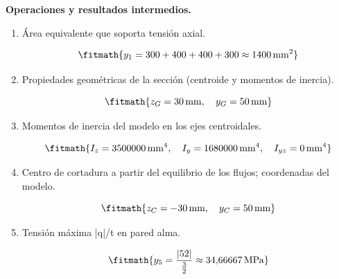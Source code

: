 \noindent\textbf{Operaciones y resultados intermedios.}

\begin{enumerate}

\item Área equivalente que soporta tensión axial.

\[\fitmath{y_{1}=300+400+400+300\approx 1400\,\mathrm{mm^{2}}}\]

\item Propiedades geométricas de la sección (centroide y momentos de inercia).

\[\fitmath{z_G=30\,\mathrm{mm},\quad y_G=50\,\mathrm{mm}}\]

\item Momentos de inercia del modelo en los ejes centroidales.

\[\fitmath{I_z=3500000\,\mathrm{mm}^{4},\quad I_y=1680000\,\mathrm{mm}^{4},\quad I_{yz}=0\,\mathrm{mm}^{4}}\]

\item Centro de cortadura a partir del equilibrio de los flujos; coordenadas del modelo.

\[\fitmath{z_C=-30\,\mathrm{mm},\quad y_C=50\,\mathrm{mm}}\]

\item Tensión máxima |q|/t en pared alma.

\[\fitmath{y_{5}=\frac{\left|52\right|}{\frac{3}{2}}\approx 34{,}66667\,\mathrm{MPa}}\]

\end{enumerate}
